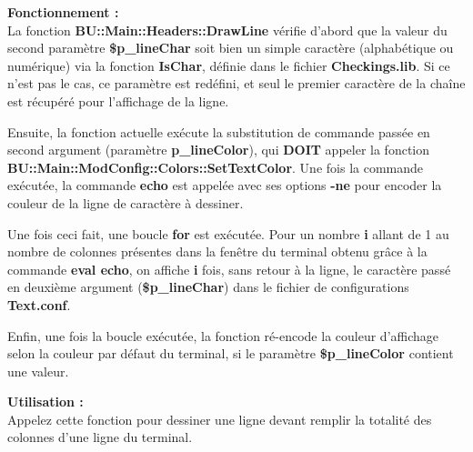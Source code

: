 \documentclass[a4paper,10pt]{article}
\begin{document}
\begin{justify}
    \textbf{Fonctionnement :}\\
    La fonction \textbf{\color{mauve}BU::Main::Headers::DrawLine} vérifie d'abord que la valeur du second paramètre \textbf{\color{orange}\$p\_lineChar} soit bien un simple caractère (alphabétique ou numérique) via la fonction \textbf{\color{mauve}IsChar}, définie dans le fichier \textbf{\color{lime}Checkings.lib}. Si ce n'est pas le cas, ce paramètre est redéfini, et seul le premier caractère de la chaîne est récupéré pour l'affichage de la ligne.
\end{justify}

\begin{justify}
    Ensuite, la fonction actuelle exécute la substitution de commande passée en second argument (paramètre \textbf{\color{orange}p\_lineColor}), qui \textbf{DOIT} appeler la fonction \textbf{\color{mauve}BU::Main::ModConfig::Colors::SetTextColor}. Une fois la commande exécutée, la commande \textbf{\color{gray}echo} est appelée avec ses options \textbf{\color{gray}-ne} pour encoder la couleur de la ligne de caractère à dessiner.
\end{justify}

\begin{justify}
    Une fois ceci fait, une boucle \textbf{for} est exécutée. Pour un nombre \textbf{i} allant de 1 au nombre de colonnes présentes dans la fenêtre du terminal obtenu grâce à la commande \textbf{\color{gray}eval echo}, on affiche \textbf{i} fois, sans retour à la ligne, le caractère passé en deuxième argument (\textbf{\color{orange}\$p\_lineChar}) dans le fichier de
configurations \textbf{\color{lime}Text.conf}.
\end{justify}

\begin{justify}
    Enfin, une fois la boucle exécutée, la fonction ré-encode la couleur d'affichage selon la couleur par défaut du terminal, si le paramètre \textbf{\color{orange}\$p\_lineColor} contient une valeur.
\end{justify}

\begin{justify}
    \textbf{Utilisation :}\\
    Appelez cette fonction pour dessiner une ligne devant remplir la totalité des colonnes d'une ligne du terminal.\\
\end{justify}


\end{document}
